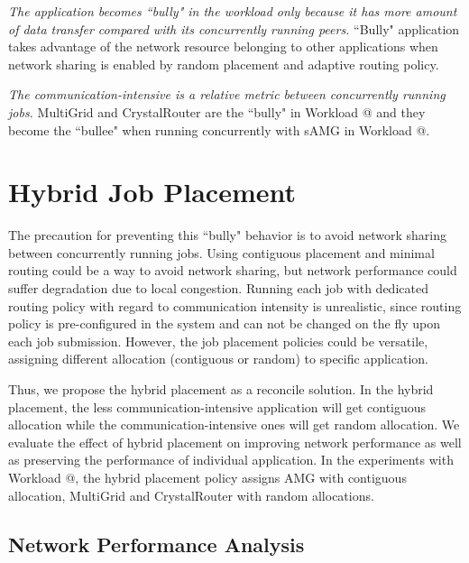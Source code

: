 \documentclass[conference,compsoc]{IEEEtran}
\makeatletter
\newcommand{\Rmnum}[1]{\expandafter\@slowromancap\romannumeral #1@}
\makeatother
\begin{document}

\emph{The application becomes ``bully" in the workload only because it has more amount of data transfer compared with its concurrently running peers.} ``Bully" application takes advantage of the network resource belonging to other applications when network sharing is enabled by random placement and adaptive routing policy. 


\emph{The communication-intensive is a relative metric between concurrently running jobs.} MultiGrid and CrystalRouter are the ``bully" in Workload \Rmnum{1} and they become the ``bullee" when running concurrently with sAMG in Workload \Rmnum{2}.


\section{Hybrid Job Placement}


The precaution for preventing this ``bully" behavior is to avoid network sharing between concurrently running jobs. Using contiguous placement and minimal routing could be a way to avoid network sharing, but network performance could suffer degradation due to local congestion. Running each job with dedicated routing policy with regard to communication intensity is unrealistic, since routing policy is pre-configured in the system and can not be changed on the fly upon each job submission. However, the job placement policies could be versatile, assigning different allocation (contiguous or random) to specific application.

Thus, we propose the hybrid placement as a reconcile solution. In the hybrid placement, the less communication-intensive application will get contiguous allocation while the communication-intensive ones will get random allocation. We evaluate the effect of hybrid placement on improving network performance as well as preserving the performance of individual application. In the experiments with Workload \Rmnum{1}, the hybrid placement policy assigns AMG with contiguous allocation, MultiGrid and CrystalRouter with random allocations.

\subsection{Network Performance Analysis}
\end{document}
